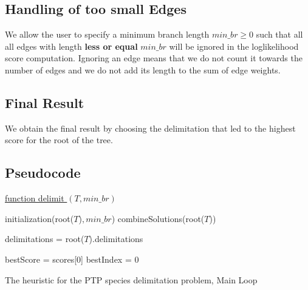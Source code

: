 \documentclass{llncs}
\begin{document}
\subsection{Handling of too small Edges}

We allow the user to specify a minimum branch length $min\_br \geq 0$ such that all all edges with length \textbf{less or equal} $min\_br$ will be ignored in the loglikelihood score computation. Ignoring an edge means that we do not count it towards the number of edges and we do not add its length to the sum of edge weights.

\subsection{Final Result}
We obtain the final result by choosing the delimitation that led to the highest score for the root of the tree.

\subsection{Pseudocode}
\begin{algorithm}


\underline{function delimit $(T, min\_br)$}\

initialization(root($T$)$, min\_br$)\;
combineSolutions(root($T$))\;

delimitations = root($T$).delimitations\;

bestScore = scores[0]\;
bestIndex = 0\;



\caption{The heuristic for the PTP species delimitation problem, Main Loop}

\end{algorithm}
\end{document}
